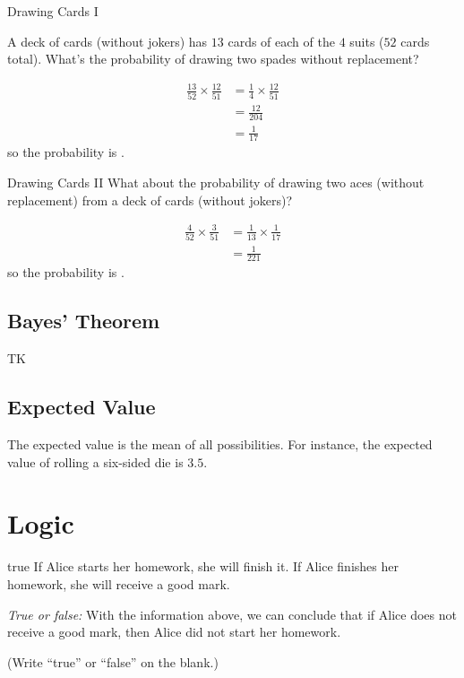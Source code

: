 \documentclass[a4paper,10pt]{report}
\begin{document}
\begin{problem}{Drawing Cards I}

 A deck of cards (without jokers) has $13$ cards of each of the $4$ suits ($52$
 cards total). What's the probability of drawing two spades without replacement?

 \begin{solution}
  \begin{align*}
   \frac{13}{52} \times \frac{12}{51}
   &= \frac{1}{4} \times \frac{12}{51} \\
   &= \frac{12}{204} \\
   &= \frac{1}{17}
  \end{align*}
  so the probability is .
 \end{solution}

\end{problem}

\begin{problem}{Drawing Cards II}
 What about the probability of drawing two aces (without replacement) from a
 deck of cards (without jokers)?

 \begin{solution}
  \begin{align*}
   \frac{4}{52} \times \frac{3}{51}
   &= \frac{1}{13} \times \frac{1}{17} \\
   &= \frac{1}{221}
  \end{align*}
  so the probability is .
 \end{solution}
\end{problem}

\section{Bayes' Theorem}

TK

\section{Expected Value}

The expected value is the mean of all possibilities. For instance, the expected
value of rolling a six-sided die is $3.5$.

\chapter{Logic}

\begin{problem}{true}
  If Alice starts her homework, she will finish it. If Alice finishes her homework, she will
  receive a good mark.

  \textit{True or false:}
  With the information above, we can conclude that if Alice does not receive a good mark,
  then Alice did not start her homework.

  (Write ``true'' or ``false'' on the blank.)
\end{problem}
\end{document}

